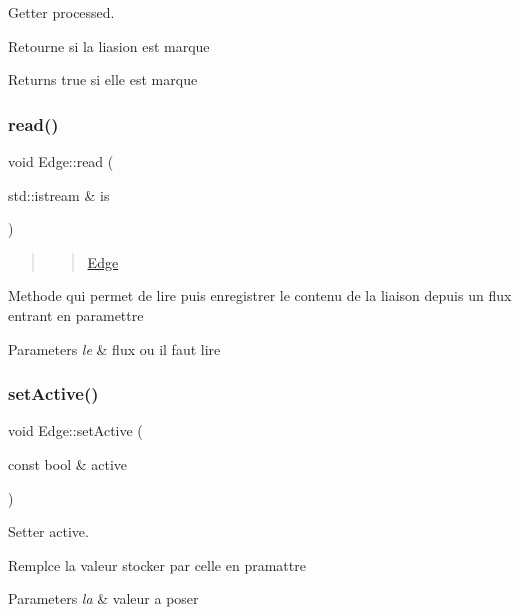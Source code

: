 Getter processed. 

Retourne si la liasion est marque

\begin{DoxyReturn}{Returns}
true si elle est marque 
\end{DoxyReturn}
\mbox{\label{class_edge_ab8dc776b635233160f040b8d3544f473}} 
\subsubsection{\texorpdfstring{read()}{read()}}
{\footnotesize\ttfamily void Edge\+::read (\begin{DoxyParamCaption}\item[{std\+::istream \&}]{is }\end{DoxyParamCaption})}



\begin{quote}
\begin{quote}
\mbox{\hyperlink{class_edge}{Edge}}\end{quote}
\end{quote}


Methode qui permet de lire puis enregistrer le contenu de la liaison depuis un flux entrant en paramettre


\begin{DoxyParams}{Parameters}
{\em le} & flux ou il faut lire \\
\hline
\end{DoxyParams}
\mbox{\label{class_edge_ad4b8227dc914a82c495812080e80b6dd}} 
\subsubsection{\texorpdfstring{set\+Active()}{setActive()}}
{\footnotesize\ttfamily void Edge\+::set\+Active (\begin{DoxyParamCaption}\item[{const bool \&}]{active }\end{DoxyParamCaption})}



Setter active. 

Remplce la valeur stocker par celle en pramattre


\begin{DoxyParams}{Parameters}
{\em la} & valeur a poser \\
\hline
\end{DoxyParams}
\mbox{\label{class_edge_a303fc7842a64e2ed4d583ea7cc273a51}} 
